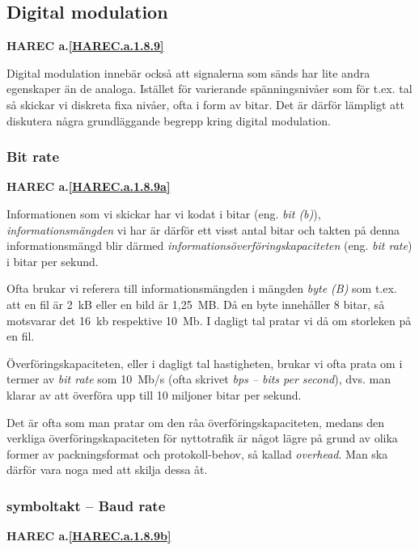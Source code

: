 \subsection{Digital modulation}
\textbf{HAREC a.\ref{HAREC.a.1.8.9}\label{myHAREC.a.1.8.9}}

Digital modulation innebär också att signalerna som sänds har lite andra
egenskaper än de analoga. Istället för varierande spänningsnivåer som för
t.ex. tal så skickar vi diskreta fixa nivåer, ofta i form av bitar. Det är
därför lämpligt att diskutera några grundläggande begrepp kring digital
modulation.

\subsubsection{Bit rate}
\textbf{HAREC a.\ref{HAREC.a.1.8.9a}\label{myHAREC.a.1.8.9a}}

Informationen som vi skickar har vi kodat i bitar (eng. \emph{bit (b)}),
\emph{informationsmängden} vi har är därför ett visst antal bitar och takten på
denna informationsmängd blir därmed \emph{informationsöverföringskapaciteten}
(eng. \emph{bit rate}) i bitar per sekund.

Ofta brukar vi referera till informationsmängden i mängden \emph{byte (B)}
som t.ex. att en fil är 2~kB eller en bild är 1,25~MB. Då en byte innehåller
8 bitar, så motsvarar det 16~kb respektive 10~Mb. I dagligt tal pratar vi då om
storleken på en fil.

Överföringskapaciteten, eller i dagligt tal hastigheten, brukar vi ofta prata
om i termer av \emph{bit rate} som 10~Mb/s (ofta skrivet \emph{bps -- bits per
second}), dvs. man klarar av att överföra upp till 10 miljoner bitar per sekund.

Det är ofta som man pratar om den råa överföringskapaciteten, medans den
verkliga överföringskapaciteten för nyttotrafik är något lägre på grund av
olika former av packningsformat och protokoll-behov, så kallad \emph{overhead}.
Man ska därför vara noga med att skilja dessa åt.

\subsubsection{symboltakt -- Baud rate}
\textbf{HAREC a.\ref{HAREC.a.1.8.9b}\label{myHAREC.a.1.8.9b}}

